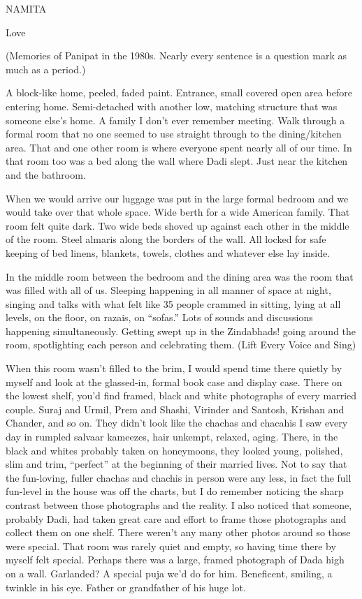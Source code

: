 NAMITA

Love

(Memories of Panipat in the 1980s. Nearly every sentence is a question mark as much as a period.)

A block-like home, peeled, faded paint. Entrance, small covered open area before entering home. Semi-detached with another low, matching structure that was someone else’s home. A family I don’t ever remember meeting. Walk through a formal room that no one seemed to use straight through to the dining/kitchen area. That and one other room is where everyone spent nearly all of our time. In that room too was a bed along the wall where Dadi slept. Just near the kitchen and the bathroom.


When we would arrive our luggage was put in the large formal bedroom and we would take over that whole space. Wide berth for a wide American family. That room felt quite dark. Two wide beds shoved up against each other in the middle of the room. Steel almaris along the borders of the wall. All locked for safe keeping of bed linens, blankets, towels, clothes and whatever else lay inside.

In the middle room between the bedroom and the dining area was the room that was filled with all of us. Sleeping happening in all manner of space at night, singing and talks with what felt like 35 people crammed in sitting, lying at all levels, on the floor, on razais, on “sofas.” Lots of sounds and discussions happening simultaneously. Getting swept up in the Zindabhads! going around the room, spotlighting each person and celebrating them. (Lift Every Voice and Sing)

When this room wasn’t filled to the brim, I would spend time there quietly by myself and look at the glassed-in, formal book case and display case. There on the lowest shelf, you’d find framed, black and white photographs of every married couple. Suraj and Urmil, Prem and Shashi, Virinder and Santosh, Krishan and Chander, and so on. They didn’t look like the chachas and chacahis I saw every day in rumpled salvaar kameezes, hair unkempt, relaxed, aging. There, in the black and whites probably taken on honeymoons, they looked young, polished, slim and trim, “perfect” at the beginning of their married lives. Not to say that the fun-loving, fuller chachas and chachis in person were any less, in fact the full fun-level in the house was off the charts, but I do remember noticing the sharp contrast between those photographs and the reality. I also noticed that someone, probably Dadi, had taken great care and effort to frame those photographs and collect them on one shelf. There weren’t any many other photos around so those were special. That room was rarely quiet and empty, so having time there by myself felt special. Perhaps there was a large, framed photograph of Dada high on a wall. Garlanded? A special puja we’d do for him. Beneficent, smiling, a twinkle in his eye. Father or grandfather of his huge lot.

